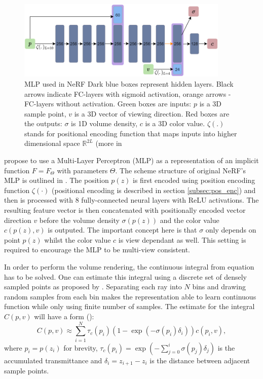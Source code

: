 \begin{figure}[!htb]
    \centering
    \includegraphics[width=0.9\textwidth]{figures/mlp_nerf.png}
    \caption{MLP used in NeRF \cite{mildenhall2020nerf} Dark blue boxes represent hidden layers. Black arrows indicate FC-layers with sigmoid activation, orange arrows - FC-layers without activation. Green boxes are inputs: $p$ is a 3D sample point, $v$ is a 3D vector of viewing direction. Red boxes are the outputs: $\sigma$ is 1D volume density, $c$ is a 3D color value. $\zeta(.)$ stands for positional encoding function that maps inputs into higher dimensional space $\mathbb{R}^{2L}$ (more in }
    \label{fig:mlp_nerf}
\end{figure}

\cite{mildenhall2020nerf} propose to use a Multi-Layer Perceptron (MLP) as a representation
of an implicit function $F = F_\Theta$ with parameters $\Theta$.
The scheme structure of original NeRF's MLP is outlined in .
The position $p(z)$ is first encoded using position encoding function $\zeta(\cdot)$ (positional encoding is described in section \ref{subsec:pos_enc}) and then is processed with 8 fully-connected neural layers with ReLU activations.
The resulting feature vector is then concatenated with positionally encoded vector direction $v$
before the volume density $\sigma(p(z))$ and the color value $c(p(z), v)$ is outputed.
The important concept here is that $\sigma$ only depends on point $p(z)$
whilst the color value $c$ is view dependant as well.
This setting is required to encourage the MLP to be multi-view consistent.

In order to perform the volume rendering, the continuous integral from equation  has to be solved.
One can estimate this integral using a discrete set of densely sampled points as proposed by \cite{mildenhall2020nerf}.
Separating each ray into $N$ bins and drawing random samples from each bin
makes the representation able to learn continuous function
while only using finite number of samples.
The estimate for the integral $C(p, v)$ will have a form (\cite{mildenhall2020nerf, max1995optical}):
\begin{equation}
    \label{eq:integral_estimation}
    C(p, v) \approx \sum_{i=1}^{N} \tau_c(p_i) (1 - \exp (-\sigma(p_i) \delta_i)) c(p_i, v),
\end{equation}
where $p_i = p(z_i)$ for brevity, $\tau_c(p_i) = \exp (-\sum_{j=0}^i \sigma(p_j) \delta_j )$ is the accumulated transmittance and $\delta_i = z_{i+1} - z_i$ is the distance between adjacent sample points.

